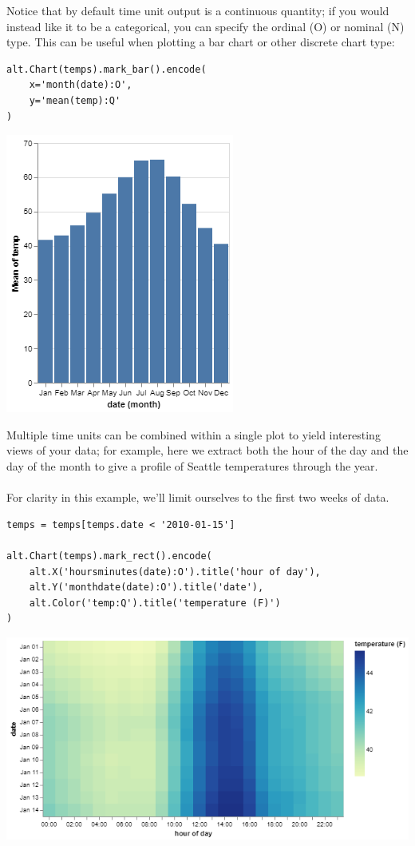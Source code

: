 \documentclass[11pt]{article}
\begin{document}
Notice that by default time unit output is a continuous quantity; if you would instead like it to be a categorical, you can specify the ordinal (O) or nominal (N) type. This can be useful when plotting a bar chart or other discrete chart type:

\begin{verbatim}
alt.Chart(temps).mark_bar().encode(
    x='month(date):O',
    y='mean(temp):Q'
)
\end{verbatim}

\begin{center}
\includegraphics[width=.5\textwidth]{visualization (3).png}
\end{center}

Multiple time units can be combined within a single plot to yield interesting views of your data; for example, here we extract both the hour of the day and the day of the month to give a profile of Seattle temperatures through the year.\\
\\
For clarity in this example, we'll limit ourselves to the first two weeks of data.

\begin{verbatim}
temps = temps[temps.date < '2010-01-15']

alt.Chart(temps).mark_rect().encode(
    alt.X('hoursminutes(date):O').title('hour of day'),
    alt.Y('monthdate(date):O').title('date'),
    alt.Color('temp:Q').title('temperature (F)')
)
\end{verbatim}

\begin{center}
\includegraphics[width=.7\textwidth]{visualization (4).png}
\end{center}
\end{document}
